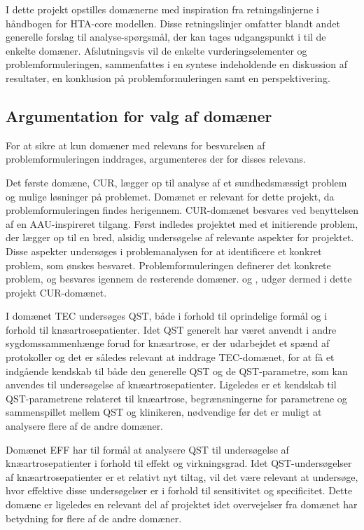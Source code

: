 I dette projekt opstilles domænerne med inspiration fra retningslinjerne i håndbogen for HTA-core modellen. Disse retningslinjer omfatter blandt andet generelle forslag til analyse-spørgsmål, der kan tages udgangspunkt i til de enkelte domæner. Afslutningsvis vil de enkelte vurderingselementer og problemformuleringen, sammenfattes i en syntese indeholdende en diskussion af resultater, en konklusion på problemformuleringen samt en perspektivering. 

\subsection{Argumentation for valg af domæner}
For at sikre at kun domæner med relevans for besvarelsen af problemformuleringen inddrages, argumenteres der for disses relevans. 

Det første domæne, CUR, lægger op til analyse af et sundhedsmæssigt problem og mulige løsninger på problemet. Domænet er relevant for dette projekt, da problemformuleringen findes herigennem. CUR-domænet besvares ved benyttelsen af en AAU-inspireret tilgang. Først indledes projektet med et initierende problem, der lægger op til en bred, alsidig undersøgelse af relevante aspekter for projektet. Disse aspekter undersøges i problemanalysen for at identificere et konkret problem, som ønskes besvaret. Problemformuleringen definerer det konkrete problem, og besvares igennem de resterende domæner.  og , udgør dermed i dette projekt CUR-domænet. 

I domænet TEC undersøges QST, både i forhold til oprindelige formål og i forhold til knæartrosepatienter. Idet QST generelt har været anvendt i andre sygdomssammenhænge forud for knæartrose, er der udarbejdet et spænd af protokoller og det er således relevant at inddrage TEC-domænet, for at få et indgående kendskab til både den generelle QST og de QST-parametre, som kan anvendes til undersøgelse af knæartrosepatienter. Ligeledes er et kendskab til QST-parametrene relateret til knæartrose, begrænsningerne for parametrene og sammenspillet mellem QST og klinikeren, nødvendige før det er muligt at analysere flere af de andre domæner. 

Domænet EFF har til formål at analysere QST til undersøgelse af knæartrosepatienter i forhold til effekt og virkningsgrad. Idet QST-undersøgelser af knæartrosepatienter er et relativt nyt tiltag, vil det være relevant at undersøge, hvor effektive disse undersøgelser er i forhold til sensitivitet og specificitet. Dette domæne er ligeledes en relevant del af projektet idet overvejelser fra domænet har betydning for flere af de andre domæner.   

